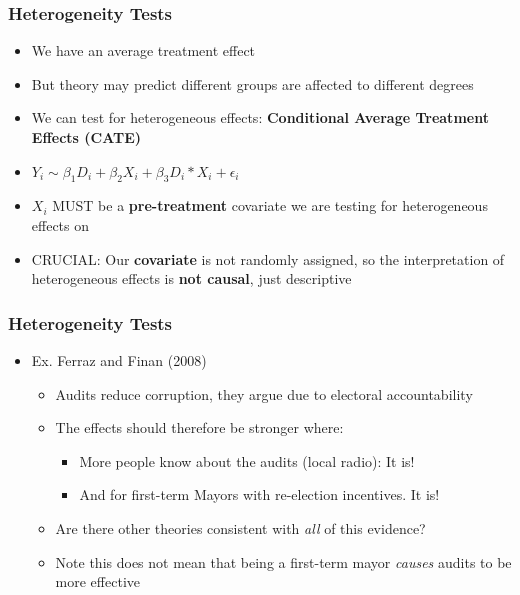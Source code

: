 \documentclass[xcolor=x11names,compress]{beamer}\usepackage[]{graphicx}\usepackage[]{color}
\renewcommand{\(}{\begin{columns}}
\renewcommand{\)}{\end{columns}}
\newcommand{\<}[1]{\begin{column}{#1}}
\renewcommand{\>}{\end{column}}
\begin{document}
\begin{frame}
\frametitle{Heterogeneity Tests}
\begin{itemize}
\item We have an average treatment effect
\pause
\item But theory may predict different groups are affected to different degrees
\pause
\item We can test for heterogeneous effects: \textbf{Conditional Average Treatment Effects (CATE)}
\pause
\item $Y_i \sim \beta_1 D_i + \beta_2 X_i + \beta_3 D_i*X_i + \epsilon_i$
\pause
\item $X_i$ MUST be a \textbf{pre-treatment} covariate we are testing for heterogeneous effects on
\pause
\item CRUCIAL: Our \textbf{covariate} is not randomly assigned, so the interpretation of heterogeneous effects is \textbf{not causal}, just descriptive
\end{itemize}
\end{frame}

\begin{frame}
\frametitle{Heterogeneity Tests}
\begin{itemize}
\item Ex. Ferraz and Finan (2008)
\begin{itemize}
\item Audits reduce corruption, they argue due to electoral accountability
\pause
\item The effects should therefore be stronger where:
\pause
\begin{itemize}
\item More people know about the audits (local radio): It is!
\pause
\item And for first-term Mayors with re-election incentives. It is!
\pause
\end{itemize}
\item Are there other theories consistent with \textit{all} of this evidence?
\pause
\item Note this does not mean that being a first-term mayor \textit{causes} audits to be more effective
\end{itemize}
\end{itemize}
\end{frame}
\end{document}
